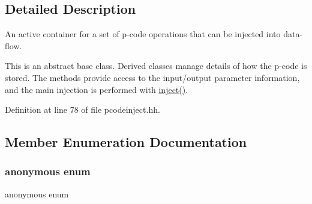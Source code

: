 \subsection{Detailed Description}
An active container for a set of p-\/code operations that can be injected into data-\/flow. 

This is an abstract base class. Derived classes manage details of how the p-\/code is stored. The methods provide access to the input/output parameter information, and the main injection is performed with \mbox{\hyperlink{class_inject_payload_aca9c322377f54e8e45c9a79e44ce0ff9}{inject()}}. 

Definition at line 78 of file pcodeinject.\+hh.



\subsection{Member Enumeration Documentation}
\mbox{\label{class_inject_payload_aa532c3794a8b6038bbfa504ace6d4ad7}} 
\subsubsection{\texorpdfstring{anonymous enum}{anonymous enum}}
{\footnotesize\ttfamily anonymous enum}

